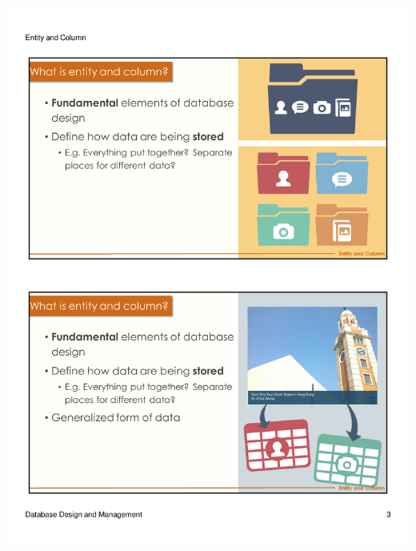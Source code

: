 \begin{frame}{ }
    \centering
    \includegraphics[width=\textwidth, trim={10mm 24mm 10mm 134mm}, clip]{resources/02/02_3}
\end{frame}

